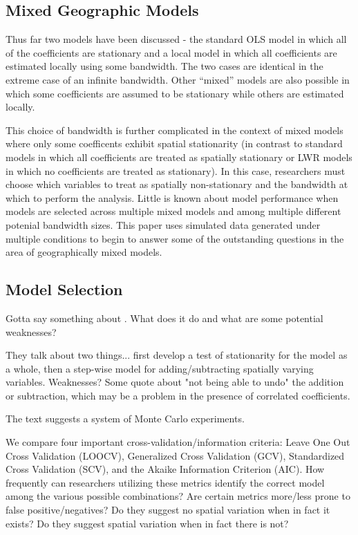 \documentclass{article}\usepackage[]{graphicx}\usepackage[]{color}
\begin{document}
\subsection{Mixed Geographic Models}

Thus far two models have been discussed - the standard OLS model in which all of the coefficients are stationary and a local model in which all coefficients are estimated locally using some bandwidth. The two cases are identical in the extreme case of an infinite bandwidth. Other ``mixed'' models are also possible in which some coefficients are assumed to be stationary while others are estimated locally. 

This choice of bandwidth is further complicated in the context of mixed models where only some coefficents exhibit spatial stationarity (in contrast to standard models in which all coefficients are treated as spatially stationary or LWR models in which no coefficients are treated as stationary). In this case, researchers must choose which variables to treat as spatially non-stationary and the bandwidth at which to perform the analysis. Little is known about model performance when models are selected across multiple mixed models and among multiple different potenial bandwidth sizes. This paper uses simulated data generated under multiple conditions to begin to answer some of the outstanding questions in the area of geographically mixed models. 



\subsection{Model Selection}

Gotta say something about \citet{Leung2000a}. What does it do and what are some potential weaknesses?

They talk about two things... first develop a test of stationarity for the model as a whole, then a step-wise model for adding/subtracting spatially varying variables. Weaknesses? Some quote about "not being able to undo" the addition or subtraction, which may be a problem in the presence of correlated coefficients.

The \citet{Fotheringham2002} text suggests a system of Monte Carlo experiments.


We compare four important cross-validation/information criteria: Leave One Out Cross Validation (LOOCV), Generalized Cross Validation (GCV), Standardized Cross Validation (SCV), and the Akaike Information Criterion (AIC). How frequently can researchers utilizing these metrics identify the correct model among the various possible combinations? Are certain metrics more/less prone to false positive/negatives? Do they suggest no spatial variation when in fact it exists? Do they suggest spatial variation when in fact there is not? 
\end{document}
